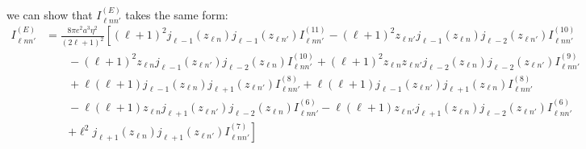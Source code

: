 we can show that $I_{\ell nn'}^{(E)}$ takes the same form:
\begin{equation}
\begin{split}
I_{\ell nn'}^{(E)} &= \frac{8\pi e^2a^3\eta^2}{(2\ell + 1)^2}\left[(\ell + 1)^2j_{\ell - 1}(z_{\ell n})j_{\ell - 1}(z_{\ell n'})I_{\ell nn'}^{(11)} - (\ell + 1)^2z_{\ell n'}j_{\ell - 1}(z_{\ell n})j_{\ell - 2}(z_{\ell n'})I_{\ell nn'}^{(10)}\right.\\
&\qquad - (\ell + 1)^2z_{\ell n}j_{\ell - 1}(z_{\ell n'})j_{\ell - 2}(z_{\ell n})I_{\ell nn'}^{(10)} + (\ell + 1)^2z_{\ell n}z_{\ell n'}j_{\ell - 2}(z_{\ell n})j_{\ell - 2}(z_{\ell n'})I_{\ell nn'}^{(9)}\\
&\qquad + \ell(\ell + 1)j_{\ell - 1}(z_{\ell n})j_{\ell + 1}(z_{\ell n'})I_{\ell nn'}^{(8)} + \ell(\ell + 1)j_{\ell - 1}(z_{\ell n'})j_{\ell + 1}(z_{\ell n})I_{\ell nn'}^{(8)}\\
&\qquad - \ell(\ell + 1)z_{\ell n}j_{\ell + 1}(z_{\ell n'})j_{\ell - 2}(z_{\ell n})I_{\ell nn'}^{(6)} - \ell(\ell + 1)z_{\ell n'}j_{\ell + 1}(z_{\ell n})j_{\ell - 2}(z_{\ell n'})I_{\ell nn'}^{(6)}\\
&\qquad\left. + \ell^2j_{\ell +1 }(z_{\ell n})j_{\ell +1 }(z_{\ell n'})I_{\ell nn'}^{(7)}\right]\\[0.5em]

\end{split}
\end{equation}
